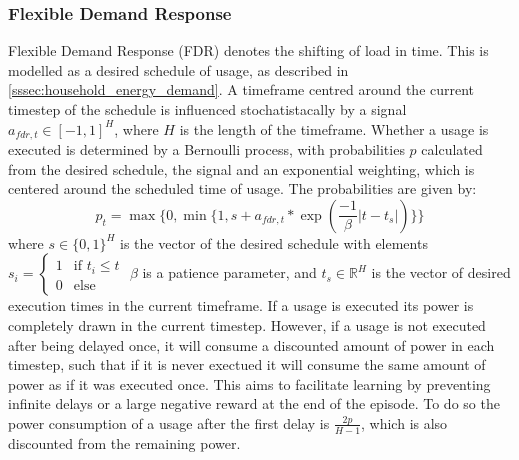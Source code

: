 \subsubsection{Flexible Demand Response}
Flexible Demand Response (FDR) denotes the shifting of load in time. This is modelled as a desired schedule of usage, as described in \ref{sssec:household_energy_demand}. A timeframe centred around the current timestep of the schedule is influenced stochatistacally by a  signal $a_{fdr, t} \in [-1 , 1]^H$, where $H$ is the length of the timeframe. Whether a usage is executed is determined by a Bernoulli process, with probabilities $p$ calculated from the desired schedule, the signal and an exponential weighting, which is centered around the scheduled time of usage. The probabilities are given by:
\begin{equation}
    p_t = \max\{0, \min\{1, s + a_{fdr, t} * \exp(\frac{-1}{\beta}|t - t_{s}|)\}\}
\end{equation}
where $s \in \{0,1\}^{H}$ is the vector of the desired schedule with elements $s_i = \begin{cases}
    1 & \text{if } t_i \leq t \\
    0 & \text{else}
\end{cases}$ $\beta$ is a patience parameter, and $t_{s} \in \mathbb{R}^{H}$ is the vector of desired execution times in the current timeframe. If a usage is executed its power is completely drawn in the current timestep. However, if a usage is not executed after being delayed once, it will consume a discounted amount of power in each timestep, such that if it is never exectued it will consume the same amount of power as if it was executed once. This aims to facilitate learning by preventing infinite delays or a large negative reward at the end of the episode. To do so the  power consumption of a usage after the first delay is $\frac{2p}{H-1}$, which is also discounted from the remaining power.

